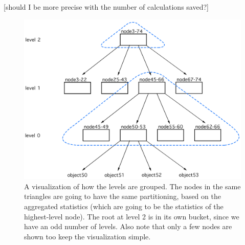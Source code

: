 [should I be more precise with the number of calculations saved?]

\begin{figure}[!htb]
  \centering
  \includegraphics[width=\textwidth,height=\textheight,keepaspectratio]{img/grouped-levels.png}
  \caption[caption]{ A visualization of how the levels are grouped. The nodes in the same triangles are going to have the same partitioning, based on the aggregated statistics (which are going to be the statistics of the highest-level node). The root at level 2 is in its own bucket, since we have an odd number of levels. Also note that only a few nodes are shown too keep the visualization simple.}
  \label{fig:Fixed-Size-buckets}
\end{figure}

